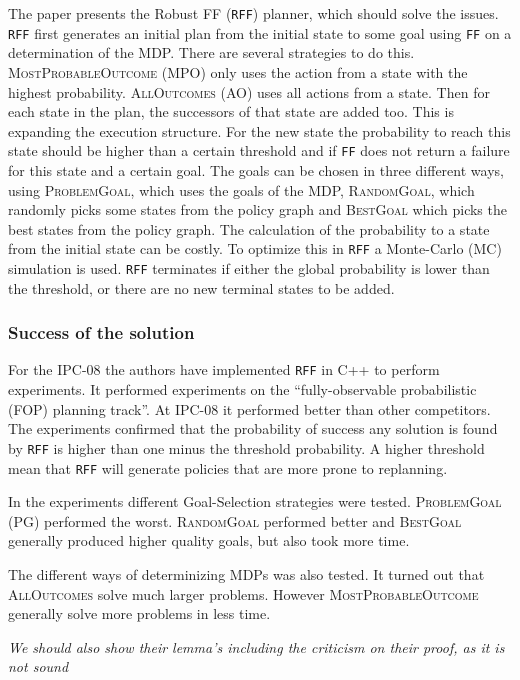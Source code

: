\documentclass[runningheads,a4paper]{llncs}
\begin{document}
The paper presents the Robust FF (\texttt{RFF}) planner, which should solve the
issues. \texttt{RFF} first generates an initial plan from the initial state to
some goal using \texttt{FF} on a determination of the MDP\@. There are several
strategies to do this. \textsc{MostProbableOutcome} (MPO) only uses the action
from a state with the highest probability. \textsc{AllOutcomes} (AO) uses all
actions from a state. Then for each state in the plan, the successors of that
state are added too. This is expanding the execution structure. For the new
state the probability to reach this state should be higher than a certain
threshold and if \texttt{FF} does not return a failure for this state and a
certain goal. The goals can be chosen in three different ways, using
\textsc{ProblemGoal}, which uses the goals of the MDP, \textsc{RandomGoal},
which randomly picks some states from the policy graph and \textsc{BestGoal}
which picks the best states from the policy graph. The calculation of the
probability to a state from the initial state can be costly. To optimize this
in \texttt{RFF} a Monte-Carlo (MC) simulation is used. \texttt{RFF} terminates
if either the global probability is lower than the threshold, or there are no
new terminal states to be added.


\subsubsection{Success of the solution}

For the IPC-08 the authors have implemented \texttt{RFF} in C++ to perform
experiments. It performed experiments on the ``fully-observable probabilistic
(FOP) planning track''. At IPC-08 it performed better than other competitors.
The experiments confirmed that the probability of success any solution is found
by \texttt{RFF} is higher than one minus the threshold probability. A higher
threshold mean that \texttt{RFF} will generate policies that are more prone to
replanning.

In the experiments different Goal-Selection strategies were tested.
\textsc{ProblemGoal} (PG) performed the worst. \textsc{RandomGoal} performed
better and \textsc{BestGoal} generally produced higher quality goals, but also
took more time.

The different ways of determinizing MDPs was also tested. It turned out that
\textsc{AllOutcomes} solve much larger problems. However
\textsc{MostProbableOutcome} generally solve more problems in less time.

\emph{We should also show their lemma's including the criticism on their proof, as it is not sound}
\end{document}
